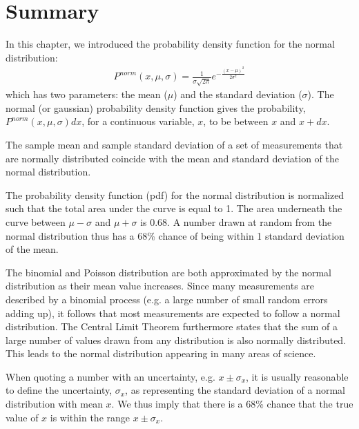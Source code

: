 \section{Summary}
\begin{chapterSummary}
In this chapter, we introduced the probability density function for the normal distribution:
\begin{align}
P^{norm}(x,\mu,\sigma)=\frac{1}{\sigma\sqrt{2\pi}}e^{-\frac{(x-\mu)^2}{2\sigma^2}}
\end{align}
which has two parameters: the mean ($\mu$) and the standard deviation ($\sigma$). The normal (or gaussian) probability density function gives the probability, $P^{norm}(x,\mu,\sigma)dx$, for a continuous variable, $x$, to be between $x$ and $x+dx$. 

The sample mean and sample standard deviation of a set of measurements that are normally distributed coincide with the mean and standard deviation of the normal distribution.  

The probability density function (pdf) for the normal distribution is normalized such that the total area under the curve is equal to 1. The area underneath the curve between $\mu-\sigma$ and $\mu+\sigma$ is 0.68. A number drawn at random from the normal distribution thus has a 68\% chance of being within 1 standard deviation of the mean. 

The binomial and Poisson distribution are both approximated by the normal distribution as their mean value increases. Since many measurements are described by a binomial process (e.g. a large number of small random errors adding up), it follows that most measurements are expected to follow a normal distribution. The Central Limit Theorem furthermore states that the sum of a large number of values drawn from any distribution is also normally distributed. This leads to the normal distribution appearing in many areas of science.

When quoting a number with an uncertainty, e.g. $x\pm\sigma_x$, it is usually reasonable to define the uncertainty, $\sigma_x$, as representing the standard deviation of a normal distribution with mean $x$. We thus imply that there is a 68\% chance that the true value of $x$ is within the range $x\pm\sigma_x$.


\end{chapterSummary}
